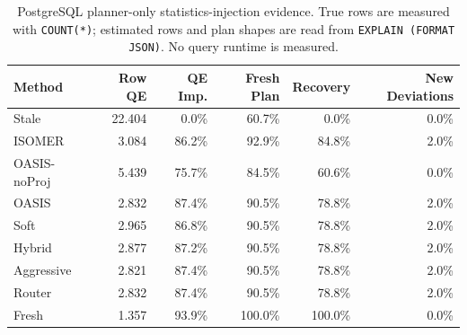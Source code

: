 \begin{table}[t]
  \centering
  \small
  \caption{PostgreSQL planner-only statistics-injection evidence. True rows are measured with \texttt{COUNT(*)}; estimated rows and plan shapes are read from \texttt{EXPLAIN (FORMAT JSON)}. No query runtime is measured.}
  \label{tab:postgres_planner_stats_injection}
  \setlength{\tabcolsep}{4pt}
  \begin{tabular}{lrrrrr}
    \toprule
    Method & Row QE & QE Imp. & Fresh Plan & Recovery & New Deviations \\
    \midrule
    Stale & 22.404 & 0.0\% & 60.7\% & 0.0\% & 0.0\% \\
    ISOMER & 3.084 & 86.2\% & 92.9\% & 84.8\% & 2.0\% \\
    OASIS-noProj & 5.439 & 75.7\% & 84.5\% & 60.6\% & 0.0\% \\
    OASIS & 2.832 & 87.4\% & 90.5\% & 78.8\% & 2.0\% \\
    Soft & 2.965 & 86.8\% & 90.5\% & 78.8\% & 2.0\% \\
    Hybrid & 2.877 & 87.2\% & 90.5\% & 78.8\% & 2.0\% \\
    Aggressive & 2.821 & 87.4\% & 90.5\% & 78.8\% & 2.0\% \\
    Router & 2.832 & 87.4\% & 90.5\% & 78.8\% & 2.0\% \\
    Fresh & 1.357 & 93.9\% & 100.0\% & 100.0\% & 0.0\% \\
    \bottomrule
  \end{tabular}
\end{table}
